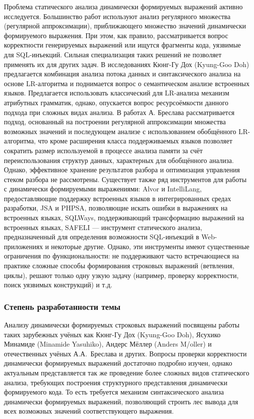 Проблема статического анализа динамически формируемых выражений активно исследуется. Большинство работ используют анализ регулярного множества (регулярной аппроксимации), приближающего множество значений динамически формируемого выражения. При этом, как правило, рассматривается вопрос корректности генерируемых выражений или ищутся фрагменты кода, уязвимые для SQL-инъекций. Сильная специализация таких решений не позволяет применять их для других задач. В исследованиях Кюнг-Гу Дох (Kyung-Goo Doh) предлагается комбинация анализа потока данных и синтаксического анализа на основе LR-алгоритма и поднимается вопрос о семантическом анализе встроенных языков. Предлагается использовать классический для LR-анализа механизм атрибутных грамматик, однако, опускается вопрос ресурсоёмкости данного подхода при сложных видах анализа. В работах А. Бреслава рассматривается подход, основанный на построении регулярной аппроксимации множества возможных значений и последующем анализе с использованием обобщённого LR-алгоритма, что кроме расширения класса поддерживаемых языков позволяет сократить размер используемой в процессе анализа памяти за счёт переиспользования структур данных, характерных для обобщённого анализа. Однако, эффективное хранение результатов разбора и оптимизация управления стеком разбора не рассмотрены. Существует также ряд инструментов для работы с динамически формируемыми выражениями: Alvor и IntelliLang, предоставляющие поддержку встроенных языков в интегрированных средах разработки, JSA и PHPSA, позволяющие искать ошибки в выражениях на встроенных языках, SQLWays, поддерживающий трансформацию выражений на встроенных языках, SAFELI --- инструмент статического анализа, предназначенный для определения возможности SQL-инъекций в Web-приложениях и некоторые другие. Однако, эти инструменты имеют существенные ограничения по функциональности: не поддерживают часто встречающиеся на практике сложные способы формирования строковых выражений (ветвления, циклы), решают только одну узкую задачу (например, проверку корректности, поиск уязвимых конструкций) и т.д. 

\subsubsection*{\large{Степень разработанности темы}}

Анализу динамически формируемых строковых выражений посвящены работы таких зарубежных учёных как Кюнг-Гу Дох (Kyung-Goo Doh), Ясухико Минамиде (Minamide Yasuhiko), Андерс Мёллер (Anders M/oller) и отечественных учёных А.А.~Бреслава и других. Вопросы проверки корректности динамически формируемых выражений достаточно подробно изучен, однако актуальным представляется так же проведение более сложных видов статического анализа, требующих построения структурного представления динамически формируемого кода. То есть требуется механизм синтаксического анализа динамически формируемых выражений, позволяющий строить лес вывода для всех возможных значений соответствующего выражения.

